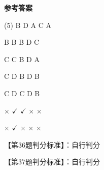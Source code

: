 \documentclass[11pt, a4paper]{article}
\begin{document}
\begin{center}
    \Huge \textbf{参考答案}
\end{center}

    \begin{tasks}[label=\arabic*. , label-width=14pt](5)
        \task B
        \task D
        \task A
        \task C
        \task A

        \task B
        \task B
        \task B
        \task D
        \task C

        \task C
        \task C
        \task B
        \task D
        \task A

        \task C
        \task D
        \task B
        \task D
        \task B

        \task C
        \task D
        \task C
        \task D
        \task B

        \task $\times$
        \task $\checkmark$
        \task $\checkmark$
        \task $\times$
        \task $\times$

        \task $\times$
        \task $\checkmark$
        \task $\times$
        \task $\times$
        \task $\times$
    \end{tasks}

    【第36题判分标准】：自行判分

    【第37题判分标准】：自行判分
\end{document}
